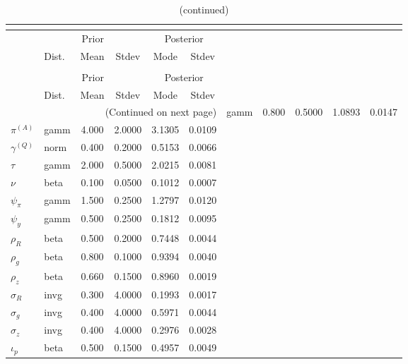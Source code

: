  
\begin{center}
\begin{longtable}{llcccc} 
\caption{Results from posterior maximization (parameters)}\\
 \label{Table:Posterior:1}\\
\toprule 
  & \multicolumn{3}{c}{Prior}  &  \multicolumn{2}{c}{Posterior} \\
  \cmidrule(r{.75em}){2-4} \cmidrule(r{.75em}){5-6}
  & Dist. & Mean  & Stdev & Mode & Stdev \\ 
\midrule \endfirsthead 
\caption{(continued)}\\
 \bottomrule 
  & \multicolumn{3}{c}{Prior}  &  \multicolumn{2}{c}{Posterior} \\
  \cmidrule(r{.75em}){2-4} \cmidrule(r{.75em}){5-6}
  & Dist. & Mean  & Stdev & Mode & Stdev \\ 
\midrule \endhead 
\bottomrule \multicolumn{6}{r}{(Continued on next page)}\endfoot 
\bottomrule\endlastfoot 
${r_{A}}$ & gamm &   0.800 & 0.5000 &   1.0893 &  0.0147 \\ 
${\pi^{(A)}}$ & gamm &   4.000 & 2.0000 &   3.1305 &  0.0109 \\ 
${\gamma^{(Q)}}$ & norm &   0.400 & 0.2000 &   0.5153 &  0.0066 \\ 
${\tau}$ & gamm &   2.000 & 0.5000 &   2.0215 &  0.0081 \\ 
${\nu}$ & beta &   0.100 & 0.0500 &   0.1012 &  0.0007 \\ 
${\psi_\pi}$ & gamm &   1.500 & 0.2500 &   1.2797 &  0.0120 \\ 
${\psi_y}$ & gamm &   0.500 & 0.2500 &   0.1812 &  0.0095 \\ 
${\rho_R}$ & beta &   0.500 & 0.2000 &   0.7448 &  0.0044 \\ 
${\rho_{g}}$ & beta &   0.800 & 0.1000 &   0.9394 &  0.0040 \\ 
${\rho_z}$ & beta &   0.660 & 0.1500 &   0.8960 &  0.0019 \\ 
${\sigma_R}$ & invg &   0.300 & 4.0000 &   0.1993 &  0.0017 \\ 
${\sigma_{g}}$ & invg &   0.400 & 4.0000 &   0.5971 &  0.0044 \\ 
${\sigma_z}$ & invg &   0.400 & 4.0000 &   0.2976 &  0.0028 \\ 
${\iota_p}$ & beta &   0.500 & 0.1500 &   0.4957 &  0.0049 \\ 
\end{longtable}
 \end{center}

